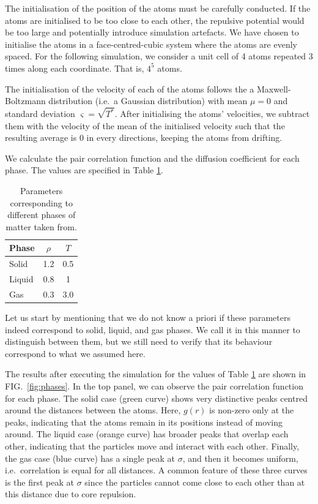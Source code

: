 \documentclass[pra,aps,superscriptaddress,amssymb,amsmath,reprint,noeprint,floatfix]{revtex4-2}
\begin{document}
The initialisation of the position of the atoms must be carefully conducted. If the atoms are initialised to be too close to each other, the repulsive potential would be too large and potentially introduce simulation artefacts. We have chosen to initialise the atoms in a face-centred-cubic system where the atoms are evenly spaced. For the following simulation, we consider a unit cell of 4 atoms repeated 3 times along each coordinate. That is, $4^5$ atoms. 

The initialisation of the velocity of each of the atoms follows the a Maxwell-Boltzmann distribution (i.e.\ a Gaussian distribution) with mean $\mu=0$ and standard deviation $\varsigma=\sqrt{T^*}$. After initialising the atoms' velocities, we subtract them with the velocity of the mean of the initialised velocity such that the resulting average is 0 in every directions, keeping the atoms from drifting.

We calculate the pair correlation function and the diffusion coefficient for each phase. The values are specified in Table \ref{tab:phases}.

\begin{table}[h]
\begin{tabular}{|l|c|c|}
\hline  Phase &$\rho$ & $T$ \\
\hline Solid & 1.2 & 0.5 \\
\hline Liquid & 0.8 & 1 \\
\hline Gas & 0.3 & 3.0 \\
\hline
\end{tabular}
\caption{\label{tab:phases}Parameters corresponding to different phases of matter taken from\cite{thijsenCP}.}
\end{table}

Let us start by mentioning that we do not know a priori if these parameters indeed correspond to solid, liquid, and gas phases. We call it in this manner to distinguish between them, but we still need to verify that its behaviour correspond to what we assumed here.

The results after executing the simulation for the values of Table \ref{tab:phases} are shown in FIG.\ \ref{fig:phases}. In the top panel, we can observe the pair correlation function for each phase. The solid case (green curve) shows very distinctive peaks centred around the distances between the atoms. Here, $g(r)$ is non-zero only at the peaks, indicating that the atoms remain in its positions instead of moving around. The liquid case (orange curve) has broader peaks that overlap each other, indicating that the particles move and interact with each other. Finally, the gas case (blue curve) has a single peak at $\sigma$, and then it becomes uniform, i.e.\ correlation is equal for all distances. A common feature of these three curves is the first peak at $\sigma$ since the particles cannot come close to each other than at this distance due to core repulsion.
\end{document}
